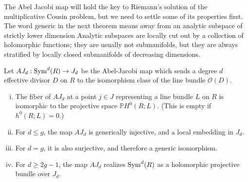 \documentclass[12pt]{article}
\begin{document}
The Abel Jacobi map will hold the key to Riemann's solution of the multiplicative Cousin problem,
but we need to settle some of its properties first.
The word generic in the next theorem means
away from an analytic subspace of strictly lower dimension
Analytic subspaces are locally cut out by a collection of holomorphic functions; they are usually not submanifolds,
but they are always stratified by locally closed submanifolds of decreasing dimensions.

\begin{theorem}
Let $AJ_d : \operatorname{Sym}^d(R) \to J_d$ be the Abel-Jacobi map which sends a degree $d$ effective divisor $D$ on $R$ to the isomorphism class of the line bundle $\mathcal{O}(D)$.
\begin{enumerate}[(i)]
\item The fiber of $AJ_d$ at a point $j \in J$ representing a line bundle $L$ on $R$
is isomorphic to the projective space $\mathbb{P}H^0(R;L)$.
(This is empty if $h^0(R;L)=0$.)
\item For $d \le g$, the map $AJ_d$ is generically injective,
and a local embedding in $J_d$.
\item For $d = g$, it is also surjective,
and therefore a generic isomorphism.
\item For $d \ge 2g - 1$, the map $AJ_d$ realizes $\operatorname{Sym}^d(R)$
as a holomorphic projective bundle over $J_d$.
\end{enumerate}
\end{theorem}
\end{document}
